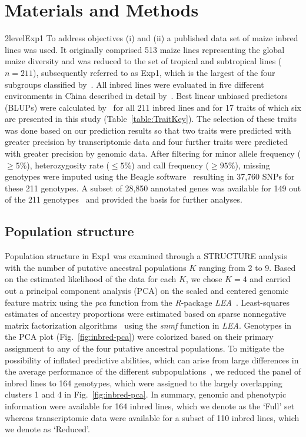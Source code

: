 \documentclass[12pt,titlepage]{article}
\begin{document}
\section{Materials and Methods}
\Genetics2level{Exp1}
To address objectives (i) and (ii) a published data set of maize inbred lines
\cite{Yang2014} was used.
It originally comprised 513 maize lines representing the global maize
diversity  and was reduced to the set of tropical and subtropical lines
($n = 211$), subsequently referred to as Exp1, which is the largest of the four
subgroups classified by~.
All inbred lines were evaluated in five different environments in China
described in detail by~.
Best linear unbiased predictors (BLUPs) were calculated by~ for
all 211 inbred lines and for 17 traits of which six are presented in this study 
(Table~\ref{table:TraitKey}).
The selection of these traits was done based on our prediction results so that
two traits were predicted with greater precision by transcriptomic data and four
further traits were predicted with greater precision by genomic data.
After filtering for minor allele frequency ($\geq 5$\%), heterozygosity rate
($\leq 5$\%) and call frequency ($\geq 95$\%), missing genotypes were imputed
using the Beagle software~\cite{Browning2009} resulting in 37,760 SNPs for these
211 genotypes.
A subset of 28,850 annotated genes was available for 149 out of the 211
genotypes~\cite{Fu2013} and provided the basis for further analyses.

\subsection{Population structure}
Population structure in Exp1 was examined through a STRUCTURE
\cite{Pritchard2000} analysis with the number of putative ancestral
populations $K$ ranging from 2 to 9.
Based on the estimated likelihood of the data for each $K$, we chose $K=4$
and carried out a principal component analysis (PCA) on the scaled and centered
genomic feature matrix using the \emph{pca} function from the \emph{R}-package
\emph{LEA}~\cite{Frichot2015}.
Least-squares estimates of ancestry proportions were estimated based on sparse 
nonnegative matrix factorization algorithms~\cite{Frichot2014} using the 
\emph{snmf} function in \emph{LEA}.
Genotypes in the PCA plot (Fig.~\ref{fig:inbred-pca}) were colorized based on their
primary assignment to any of the four putative ancestral populations.
To mitigate the possibility of inflated predictive abilities, which can arise
from large differences in the average performance of the different
subpopulations~\cite{Windhausen2012}, we reduced the panel of inbred lines to
164 genotypes, which were assigned to the largely overlapping clusters 1 and 4 in
Fig.~\ref{fig:inbred-pca}.
In summary, genomic and phenotypic information were available for 164 inbred
lines, which we denote as the `Full' set whereas transcriptomic data were available
for a subset of 110 inbred lines, which we denote as `Reduced'.
\end{document}
